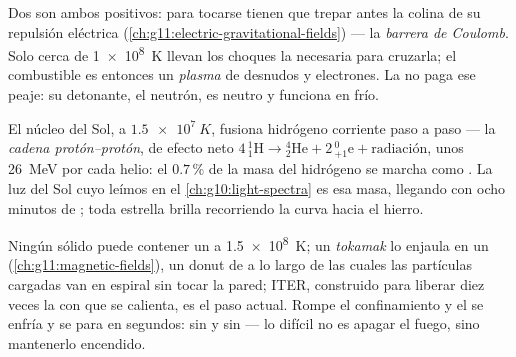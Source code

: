 \begin{definition}\label{def:g12:nuclear-energy:barrier}
Dos  son ambos positivos: para tocarse tienen que trepar antes la colina de su
repulsión eléctrica (\cref{ch:g11:electric-gravitational-fields}) --- la \emph{barrera
de Coulomb}. Solo cerca de \qty{1e8}{K} llevan los choques
la  necesaria para cruzarla; el combustible es entonces un
\emph{plasma} de  desnudos y electrones. La  no paga ese
peaje: su detonante, el neutrón, es neutro y funciona en frío.
\end{definition}

\begin{example}\label{ex:g12:nuclear-energy:sun}
El núcleo del Sol, a $\qty{1.5e7}{K}$, fusiona hidrógeno corriente paso a paso --- la
\emph{cadena protón--protón}, de efecto neto
$4\,{}^{1}_{1}\mathrm{H} \to {}^{4}_{2}\mathrm{He} + 2\,{}^{0}_{+1}\mathrm{e}
+ \text{radiación}$, unos \qty{26}{MeV} por cada helio: el $0.7\,\%$ de la masa del
hidrógeno se marcha como . La luz del Sol cuyo  leímos en el
\cref{ch:g10:light-spectra} es esa masa, llegando con ocho minutos de ; toda
estrella brilla recorriendo la curva hacia el hierro.
\end{example}

\begin{remark}\label{rem:g12:nuclear-energy:iter}
Ningún sólido puede contener un  a \qty{1.5e8}{K}; un \emph{tokamak} lo enjaula
en un  (\cref{ch:g11:magnetic-fields}), un donut de  a lo
largo de las cuales las partículas cargadas van en espiral sin tocar la pared; ITER,
construido para liberar diez veces la  con que se calienta, es el paso actual.
Rompe el confinamiento y el  se enfría y se para en segundos: sin  y sin  --- lo difícil no es apagar el fuego, sino mantenerlo
encendido.
\end{remark}

